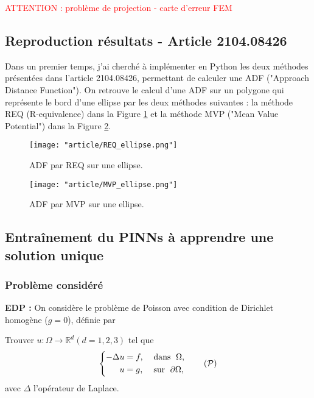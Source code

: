 \graphicspath{{weeks/images/week_4/}}

\textcolor{red}{ATTENTION : problème de projection - carte d'erreur FEM}

\subsection{Reproduction résultats - Article 2104.08426}

Dans un premier temps, j'ai cherché à implémenter en Python les deux méthodes présentées dans l'article 2104.08426, permettant de calculer une ADF ("Approach Distance Function"). On retrouve le calcul d'une ADF sur un polygone qui représente le bord d'une ellipse par les deux méthodes suivantes :  la méthode REQ (R-equivalence) dans la Figure \ref{REQ} et la méthode MVP ("Mean Value Potential") dans la Figure \ref{MVP}.

\begin{minipage}{0.38\linewidth}
	\begin{figure}[H]
		\centering
		\texttt{[image: "article/REQ\_ellipse.png"]}
		\caption{ADF par REQ sur une ellipse.}
		\label{REQ}
	\end{figure}
\end{minipage}
\begin{minipage}{0.58\linewidth}
	\begin{figure}[H]
		\centering
		\texttt{[image: "article/MVP\_ellipse.png"]}
		\caption{ADF par MVP sur une ellipse.}
		\label{MVP}
	\end{figure}
\end{minipage}

\subsection{Entraînement du PINNs à apprendre une solution unique}

\subsubsection{Problème considéré}

\textbf{EDP :} On considère le problème de Poisson avec condition de Dirichlet homogène ($g=0$), définie par

Trouver $u : \Omega \rightarrow \mathbb{R}^d (d=1,2,3)$ tel que
\begin{equation}
	\left\{
	\begin{aligned}
		-\Delta u &= f, \; &&\text{dans } \; \Omega, \\
		u&=g, \; &&\text{sur } \; \partial\Omega,
	\end{aligned}
	\right. \tag{$\mathcal{P}$} \label{pb_initial}
\end{equation}
avec $\Delta$ l'opérateur de Laplace.

